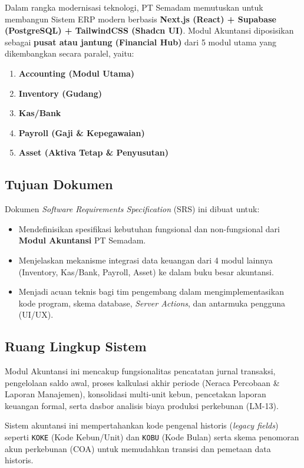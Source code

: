 \documentclass[11pt,a4paper]{article}
\begin{document}
Dalam rangka modernisasi teknologi, PT Semadam memutuskan untuk membangun Sistem ERP modern berbasis \textbf{Next.js (React) + Supabase (PostgreSQL) + TailwindCSS (Shadcn UI)}. Modul Akuntansi diposisikan sebagai \textbf{pusat atau jantung (Financial Hub)} dari 5 modul utama yang dikembangkan secara paralel, yaitu:
\begin{enumerate}
    \item \textbf{Accounting (Modul Utama)}
    \item \textbf{Inventory (Gudang)}
    \item \textbf{Kas/Bank}
    \item \textbf{Payroll (Gaji \& Kepegawaian)}
    \item \textbf{Asset (Aktiva Tetap \& Penyusutan)}
\end{enumerate}

\subsection{Tujuan Dokumen}
Dokumen \textit{Software Requirements Specification} (SRS) ini dibuat untuk:
\begin{itemize}
    \item Mendefinisikan spesifikasi kebutuhan fungsional dan non-fungsional dari \textbf{Modul Akuntansi} PT Semadam.
    \item Menjelaskan mekanisme integrasi data keuangan dari 4 modul lainnya (Inventory, Kas/Bank, Payroll, Asset) ke dalam buku besar akuntansi.
    \item Menjadi acuan teknis bagi tim pengembang dalam mengimplementasikan kode program, skema database, \textit{Server Actions}, dan antarmuka pengguna (UI/UX).
\end{itemize}

\subsection{Ruang Lingkup Sistem}
Modul Akuntansi ini mencakup fungsionalitas pencatatan jurnal transaksi, pengelolaan saldo awal, proses kalkulasi akhir periode (Neraca Percobaan \& Laporan Manajemen), konsolidasi multi-unit kebun, pencetakan laporan keuangan formal, serta dasbor analisis biaya produksi perkebunan (LM-13).

\begin{notealert}
Sistem akuntansi ini mempertahankan kode pengenal historis (\textit{legacy fields}) seperti \texttt{KOKE} (Kode Kebun/Unit) dan \texttt{KOBU} (Kode Bulan) serta skema penomoran akun perkebunan (COA) untuk memudahkan transisi dan pemetaan data historis.
\end{notealert}
\end{document}
